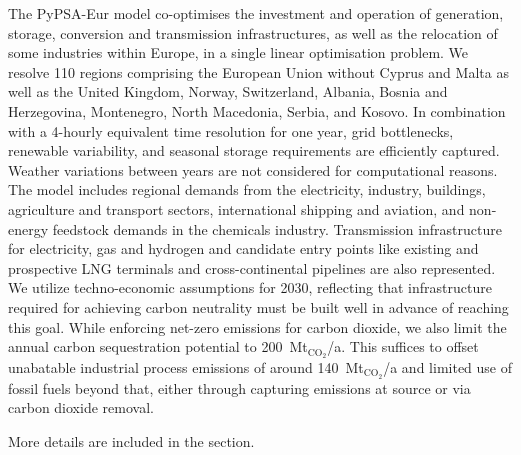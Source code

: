 The PyPSA-Eur\cite{PyPSAEurSecSectorCoupled} model co-optimises the investment
and operation of generation, storage, conversion and transmission
infrastructures, as well as the relocation of some industries within
Europe,\cite{verpoortEstimatingRenewables2023,samadiRenewablesPull2023} in a
single linear optimisation problem. We resolve 110 regions comprising the
European Union without Cyprus and Malta as well as the United Kingdom, Norway,
Switzerland, Albania, Bosnia and Herzegovina, Montenegro, North Macedonia,
Serbia, and Kosovo. In combination with a 4-hourly equivalent time resolution
for one year, grid bottlenecks, renewable variability, and seasonal storage
requirements are efficiently captured. Weather variations between years are not
considered for computational reasons. The model includes regional demands from
the electricity, industry, buildings, agriculture and transport sectors,
international shipping and aviation, and non-energy feedstock demands in the
chemicals industry. Transmission infrastructure for electricity, gas and
hydrogen and candidate entry points like existing and prospective LNG terminals
and cross-continental pipelines are also represented. We utilize techno-economic
assumptions for 2030\cite{dea2019}, reflecting that infrastructure required for
achieving carbon neutrality must be built well in advance of reaching this goal.
While enforcing net-zero emissions for carbon dioxide, we also limit the annual
carbon sequestration potential to 200~Mt$_{\text{CO}_2}$/a. This suffices to
offset unabatable industrial process emissions of around
140~Mt$_{\text{CO}_2}$/a and limited use of fossil fuels beyond that, either
through capturing emissions at source or via carbon dioxide removal.

More details are included in the  section.